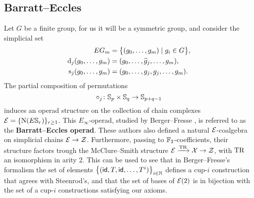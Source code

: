 \subsection{Barratt--Eccles}

Let $G$ be a finite group, for us it will be a symmetric group, and consider the simplicial set
\[
\begin{split}
	EG_m &= \big\{ (g_0, \dots, g_m) \mid g_i \in G \big\}, \\
	\operatorname{d}_j(g_0, \dots, g_m) &= (g_0, \dots, \widehat g_j, \dots, g_m), \\
	\operatorname{s}_j(g_0, \dots, g_m) &= (g_0, \dots, g_j, g_j, \dots, g_m).
\end{split}
\]
The partial composition of permutations
\[
\circ_j \colon \mathbb{S}_p \times \mathbb{S}_q \to \mathbb{S}_{p+q-1}
\]
induces an operad structure on the collection of chain complexes $\mathcal{E} = \{\operatorname{N}(E \mathbb{S}_r)\}_{r\geq1}$.
This $E_\infty$-operad, studied by Berger--Fresse \cite{berger2004combinatorial}, is referred to as the \textbf{Barratt--Eccles operad}.
These authors also defined a natural $\mathcal{E}$-coalgebra on simplicial chains $\mathcal{E} \to \mathcal{Z}$.
Furthermore, passing to ${\mathbb{F}_2}$-coefficients, their structure factors trough the McClure--Smith structure $\mathcal{E} \xrightarrow{\operatorname{TR}} \mathcal{X} \to \mathcal{Z}$, with $\operatorname{TR}$ an isomorphism in arity 2.
This can be used to see that in Berger--Fresse's formalism the set of elements $\big\{ (\mathsf{id}, T, \mathsf{id}, \dots, T^i) \big\}_{i \in \mathbb{N}}$ defines a \mbox{cup-$i$} construction that agrees with Steenrod's, and that the set of bases of $\mathcal{E}(2)$ is in bijection with the set of a \mbox{cup-$i$} constructions satisfying our axioms.
